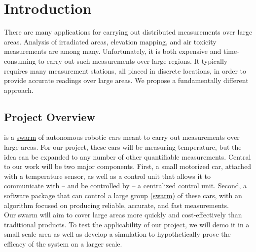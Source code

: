 \documentclass[11pt]{article}
\begin{document}
\newpage

\section{Introduction}

There are many applications for carrying out distributed measurements over large areas. Analysis of irradiated areas, elevation mapping, and air toxicity measurements are among many. Unfortunately, it is both expensive and time-consuming to carry out such measurements over large regions. It typically requires many measurement stations, all placed in discrete locations, in order to provide accurate readings over large areas. We propose a fundamentally different approach.

\subsection{Project Overview}

\PROJECTNAME \space is a \hyperref[sec:definitions]{swarm} of autonomous robotic cars meant to carry out measurements over large areas. For our project, these cars will be measuring temperature, but the idea can be expanded to any number of other quantifiable measurements. Central to our work will be two major components. First, a small motorized car, attached with a temperature sensor, as well as a control unit that allows it to communicate with – and be controlled by – a centralized control unit. Second, a software package that can control a large group (\hyperref[sec:definitions]{swarm}) of these cars, with an algorithm focused on producing reliable, accurate, and fast measurements.\\

Our swarm will aim to cover large areas more quickly and cost-effectively than traditional products. To test the applicability of our project, we will demo it in a small scale area as well as develop a simulation to hypothetically prove the efficacy of the system on a larger scale.\\
\end{document}
